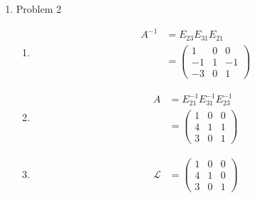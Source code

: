 \documentclass{article}
\begin{document}
\begin{enumerate}
\item Problem 2
    \begin{enumerate}
    \item 
    \begin{align*}
        A^{-1} &= E_{23}E_{31}E_{21}\\
               &= \begin{pmatrix} 1 & 0 & 0 \\ -1 & 1 & -1 \\ -3 & 0 & 1 \end{pmatrix}
    \end{align*}
    \item 
    \begin{align*}
        A &= E_{21}^{-1}E_{31}^{-1}E_{23}^{-1}\\
          &= \begin{pmatrix} 1 & 0 & 0 \\ 4 & 1 & 1 \\ 3 & 0 & 1 \end{pmatrix}
    \end{align*}

    \item 
    \begin{align*}
        \mathcal{L} &= \begin{pmatrix} 1 & 0 & 0 \\ 4 & 1 & 0 \\ 3 & 0 & 1 \end{pmatrix}
    \end{align*}
    \end{enumerate}


\end{enumerate}
\end{document}
